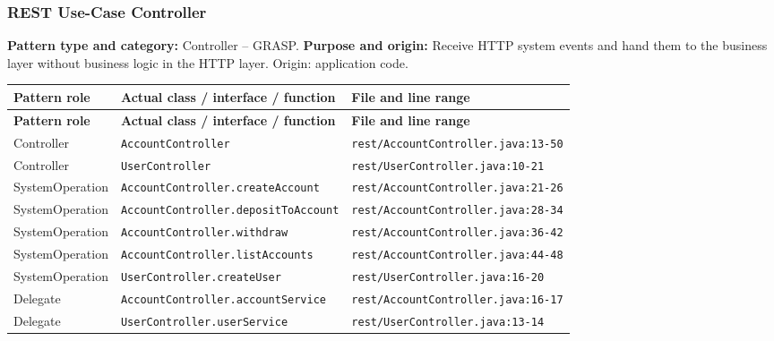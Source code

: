 \documentclass[11pt,a4paper]{article}
\begin{document}
\subsubsection{REST Use-Case Controller}
\textbf{Pattern type and category:} Controller -- GRASP. \textbf{Purpose and origin:} Receive HTTP system events and hand them to the business layer without business logic in the HTTP layer. Origin: application code.
{\footnotesize
\begin{longtable}{@{}p{3.1cm}p{5.6cm}p{7cm}@{}}
\toprule \textbf{Pattern role} & \textbf{Actual class / interface / function} & \textbf{File and line range} \\ \midrule \endfirsthead
\toprule \textbf{Pattern role} & \textbf{Actual class / interface / function} & \textbf{File and line range} \\ \midrule \endhead
\bottomrule \endfoot
Controller & \texttt{AccountController} & \texttt{rest/\allowbreak{}AccountController.\allowbreak{}java:\allowbreak{}13-50} \\
Controller & \texttt{UserController} & \texttt{rest/\allowbreak{}UserController.\allowbreak{}java:\allowbreak{}10-21} \\
SystemOperation & \texttt{AccountController.\allowbreak{}createAccount} & \texttt{rest/\allowbreak{}AccountController.\allowbreak{}java:\allowbreak{}21-26} \\
SystemOperation & \texttt{AccountController.\allowbreak{}depositToAccount} & \texttt{rest/\allowbreak{}AccountController.\allowbreak{}java:\allowbreak{}28-34} \\
SystemOperation & \texttt{AccountController.\allowbreak{}withdraw} & \texttt{rest/\allowbreak{}AccountController.\allowbreak{}java:\allowbreak{}36-42} \\
SystemOperation & \texttt{AccountController.\allowbreak{}listAccounts} & \texttt{rest/\allowbreak{}AccountController.\allowbreak{}java:\allowbreak{}44-48} \\
SystemOperation & \texttt{UserController.\allowbreak{}createUser} & \texttt{rest/\allowbreak{}UserController.\allowbreak{}java:\allowbreak{}16-20} \\
Delegate & \texttt{AccountController.\allowbreak{}accountService} & \texttt{rest/\allowbreak{}AccountController.\allowbreak{}java:\allowbreak{}16-17} \\
Delegate & \texttt{UserController.\allowbreak{}userService} & \texttt{rest/\allowbreak{}UserController.\allowbreak{}java:\allowbreak{}13-14} \\
\end{longtable}
}
\end{document}
